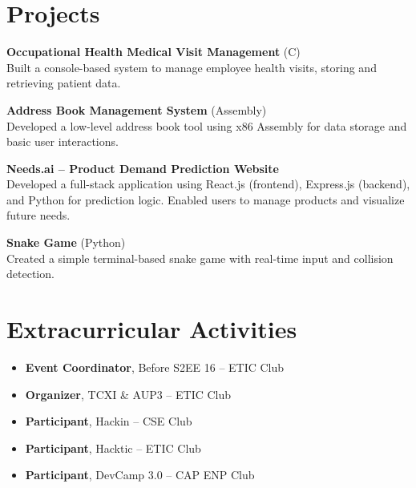 \documentclass[a4paper,10pt]{article}
\begin{document}
\section*{Projects}
\textbf{Occupational Health Medical Visit Management} (C) \\
Built a console-based system to manage employee health visits, storing and retrieving patient data.

\textbf{Address Book Management System} (Assembly) \\
Developed a low-level address book tool using x86 Assembly for data storage and basic user interactions.

\textbf{Needs.ai – Product Demand Prediction Website} \\
Developed a full-stack application using React.js (frontend), Express.js (backend), and Python for prediction logic. Enabled users to manage products and visualize future needs.

\textbf{Snake Game} (Python) \\
Created a simple terminal-based snake game with real-time input and collision detection.

\section*{Extracurricular Activities}
\begin{itemize}
    \item \textbf{Event Coordinator}, Before S2EE 16 – ETIC Club
    \item \textbf{Organizer}, TCXI \& AUP3 – ETIC Club
    \item \textbf{Participant}, Hackin – CSE Club
    \item \textbf{Participant}, Hacktic – ETIC Club
    \item \textbf{Participant}, DevCamp 3.0 – CAP ENP Club
\end{itemize}
\end{document}
